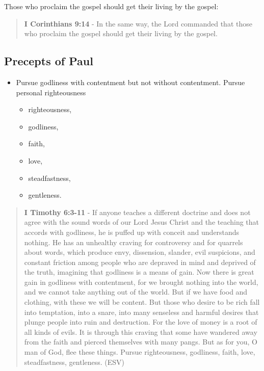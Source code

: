 \documentclass[11pt]{article}
\begin{document}
Those who proclaim the gospel should get their living by the gospel:

\begin{quote}
\textbf{I Corinthians 9:14} - In the same way, the Lord commanded that those who proclaim the gospel should get their living by the gospel.
\end{quote}

\subsection{Precepts of Paul}
\label{sec:org76d0868}
\begin{itemize}
\item Pursue godliness with contentment but not without contentment. Pursue personal righteousness
\begin{itemize}
\item righteousness,
\item godliness,
\item faith,
\item love,
\item steadfastness,
\item gentleness.
\end{itemize}
\end{itemize}

\begin{quote}
\textbf{I Timothy 6:3-11} - If anyone teaches a different doctrine and does not agree with the sound words of our Lord Jesus Christ and the teaching that accords with godliness, he is puffed up with conceit and understands nothing. He has an unhealthy craving for controversy and for quarrels about words, which produce envy, dissension, slander, evil suspicions, and constant friction among people who are depraved in mind and deprived of the truth, imagining that godliness is a means of gain.  Now there is great gain in godliness with contentment, for we brought nothing into the world, and we cannot take anything out of the world.  But if we have food and clothing, with these we will be content.  But those who desire to be rich fall into temptation, into a snare, into many senseless and harmful desires that plunge people into ruin and destruction.  For the love of money is a root of all kinds of evils. It is through this craving that some have wandered away from the faith and pierced themselves with many pangs.  But as for you, O man of God, flee these things. Pursue righteousness, godliness, faith, love, steadfastness, gentleness. (ESV)
\end{quote}
\end{document}
